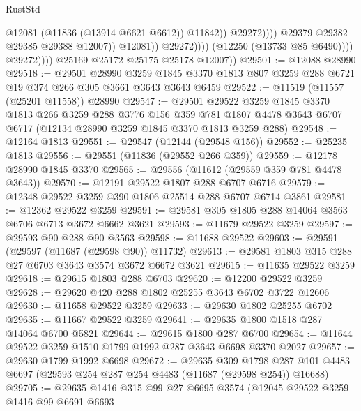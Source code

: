 \begin{lexlean}{RustStd}
\begin{coremodule}
                                                @12081
                                                (@11836 (@13914 @6621 @6612))
                                                @11842))
                                            @29272))))
                                    @29379
                                    @29382
                                    @29385
                                    @29388
                                    @12007))
                                @12081))
                            @29272))))
                    (@12250 (@13733 @85 @6490))))
                @29272))))
        @25169
        @25172
        @25175
        @25178
        @12007))
@29501 := @12088 @28990
@29518 := @29501
    @28990
    @3259
    @1845
    @3370
    @1813
    @807
    @3259
    @288
    @6721
    @19
    @374
    @266
    @305
    @3661
    @3643
    @3643
    @6459
@29522 := @11519 (@11557 (@25201 @11558)) @28990
@29547 := @29501
    @29522
    @3259
    @1845
    @3370
    @1813
    @266
    @3259
    @288
    @3776
    @156
    @359
    @781
    @1807
    @4478
    @3643
    @6707
    @6717
    (@12134 @28990 @3259 @1845 @3370 @1813 @3259 @288)
@29548 := @12164 @1813
@29551 := @29547 (@12144 (@29548 @156))
@29552 := @25235 @1813
@29556 := @29551 (@11836 (@29552 @266 @359))
@29559 := @12178 @28990 @1845 @3370
@29565 := @29556 (@11612 (@29559 @359 @781 @4478 @3643))
@29570 := @12191 @29522 @1807 @288 @6707 @6716
@29579 := @12348 @29522 @3259 @390 @1806 @25514 @288 @6707 @6714 @3861
@29581 := @12362 @29522 @3259
@29591 := @29581 @305 @1805 @288 @14064 @3563 @6706 @6713 @3672 @6662 @3621
@29593 := @11679 @29522 @3259
@29597 := @29593 @90 @288 @90 @3563
@29598 := @11688 @29522
@29603 := @29591 (@29597 (@11687 (@29598 @90)) @11732)
@29613 := @29581 @1803 @315 @288 @27 @6703 @3643 @3574 @3672 @6672 @3621
@29615 := @11635 @29522 @3259
@29618 := @29615 @1803 @288 @6703
@29620 := @12200 @29522 @3259
@29628 := @29620 @420 @288 @1802 @25255 @3643 @6702 @3722 @12606
@29630 := @11658 @29522 @3259
@29633 := @29630 @1802 @25255 @6702
@29635 := @11667 @29522 @3259
@29641 := @29635 @1800 @1518 @287 @14064 @6700 @5821
@29644 := @29615 @1800 @287 @6700
@29654 := @11644 @29522 @3259 @1510 @1799 @1992 @287 @3643 @6698 @3370 @2027
@29657 := @29630 @1799 @1992 @6698
@29672 := @29635
    @309
    @1798
    @287
    @101
    @4483
    @6697
    (@29593 @254 @287 @254 @4483 (@11687 (@29598 @254)) @16688)
@29705 := @29635
    @1416
    @315
    @99
    @27
    @6695
    @3574
    (@12045
      @29522
      @3259
      @1416
      @99
      @6691
      @6693

\end{coremodule}
\end{lexlean}

